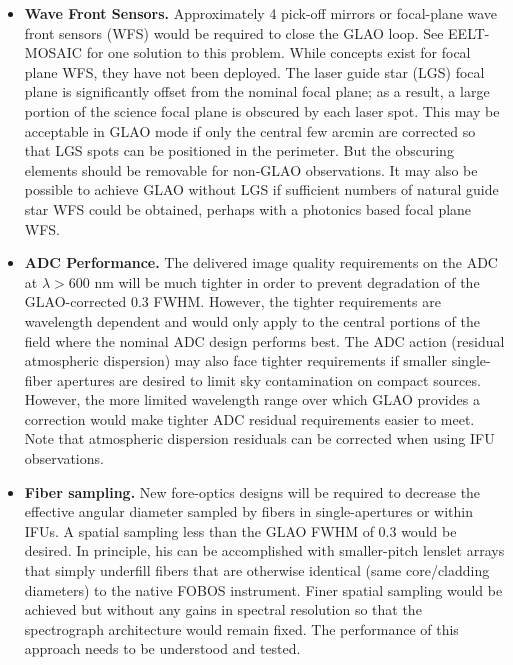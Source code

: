 \documentclass[11pt,a4paper,twoside,onecolumn,openany,final,oldfontcommands]{memoir}
\begin{document}
\begin{itemize}
\item \textbf{Wave Front Sensors.} Approximately 4 pick-off mirrors or focal-plane wave front sensors (WFS) would be required to close the GLAO loop.  See EELT-MOSAIC for one solution to this problem.  While concepts exist for focal plane WFS, they have not been deployed.  The laser guide star (LGS) focal plane is significantly offset from the nominal focal plane; as a result, a large portion of the science focal plane is obscured by each laser spot.  This may be acceptable in GLAO mode if only the central few arcmin are corrected so that LGS spots can be positioned in the perimeter.  But the obscuring elements should be removable for non-GLAO observations.  It may also be possible to achieve GLAO without LGS if sufficient numbers of natural guide star WFS could be obtained, perhaps with a photonics based focal plane WFS.

\item \textbf{ADC Performance.} The delivered image quality requirements on the ADC at $\lambda > 600$ nm will be much tighter in order to prevent degradation of the GLAO-corrected 0.3\arcsec{} FWHM.  However, the tighter requirements are wavelength dependent and would only apply to the central portions of the field where the nominal ADC design performs best.  The ADC action (residual atmospheric dispersion) may also face tighter requirements if smaller single-fiber apertures are desired to limit sky contamination on compact sources.  However, the more limited wavelength range over which GLAO provides a correction would make tighter ADC residual requirements easier to meet.  Note that atmospheric dispersion residuals can be corrected when using IFU observations.

\item \textbf{Fiber sampling.} New fore-optics designs will be required to decrease the effective angular diameter sampled by fibers in single-apertures or within IFUs.  A spatial sampling less than the GLAO FWHM of 0.3\arcsec{} would be desired.  In principle, his can be accomplished with smaller-pitch lenslet arrays that simply underfill fibers that are otherwise identical (same core/cladding diameters) to the native FOBOS instrument.  Finer spatial sampling would be achieved but without any gains in spectral resolution so that the spectrograph architecture would remain fixed.  The performance of this approach needs to be understood and tested.

\end{itemize}
\end{document}
